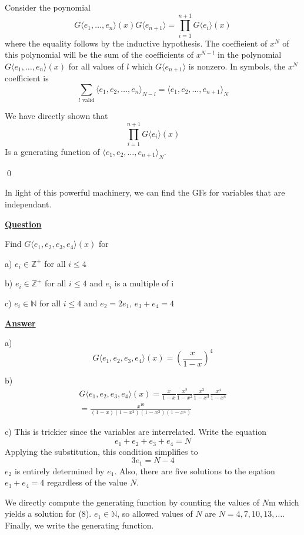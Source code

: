 \documentclass{article}
\newcommand{\new}[1]{
    \vspace{2mm}
    \noindent
    \textbf{
    \underline{#1}}
}
\begin{document}
Consider the poynomial 
\[
    G\langle e_1 , \dots, e_n \rangle(x)
    G\langle e_{n + 1} \rangle
    = 
    \prod_{i = 1}^{n + 1} 
    G\langle e_i \rangle(x)
\]where the equality follows by the inductive hypothesis. 
The coeffieient of $x^{N}$ of this polynomial 
will be the sum of the coefficients of $x^{N - l}$
in the polynomial $G\langle e_1 , \dots, e_n \rangle(x)$ 
for all values of $l$ which $G\langle e_{n+1}\rangle$
is nonzero. In symbols, the $x^N$ coefficient is 
\[
   \sum_{l \textrm{ valid}}
    \langle 
        e_1, e_2 , \dots, e_n
    \rangle _{N - l}
    = \langle 
        e_1, e_2 , \dots, e_{n + 1}
    \rangle _{N}
\]

We have directly shown that 
\[
    \prod_{i = 1}^{n + 1} 
    G\langle e_i \rangle(x)
\]
Is a generating function of $\langle 
        e_1, e_2 , \dots, e_{n + 1}
    \rangle _{N}$. 
    
    \hfill \qed

In light of this powerful machinery, we can find the 
GFs for variables that are independant. 

\new{Question}
Find $G\langle e_1, e_2, e_3, e_4\rangle (x)$ for 

a) $e_i \in \mathbb{Z}^+$ for all $i \leq 4$

b) $e_i \in \mathbb{Z}^+$ for all $i \leq 4$
and $e_i$ is a multiple of i

c) $e_i \in \mathbb{N}$ for all $i \leq 4$
and $e_2 = 2e_1$, $e_3 + e_4 = 4$

\new{Answer}

a) 
\[G\langle e_1, e_2, e_3, e_4\rangle (x) 
= 
\left(
\frac x {1- x}
\right)^4
\]

b) 
\[
    \begin{split}G\langle e_1, e_2, e_3, e_4\rangle (x) 
= 
\frac x {1- x}
\frac {x^2} {1- x^2}
\frac {x^3} {1- x^3}
\frac {x^4} {1- x^4}
\\= 
\frac {x^{10} }
{
    (1 - x)(1 - x^2)(1- x^3) (1 - x^4)
}
\end{split}
\]

c)
This is trickier since the variables 
are interrelated. Write the equation
\[
        e_1+ e_2+ e_3+ e_4  = N
\]
Applying the substitution, this condition simplifies to 
\begin{equation}
    3e_1 = N - 4
\end{equation}
$e_2$ is entirely determined by $e_1$. Also, there 
are five solutions to the eqation $e_3 + e_4 = 4$
regardless of the value $N$. 

We directly compute the generating function by counting 
the values of $N$m which yields a solution for (8). 
$e_1 \in \mathbb{N}$, so allowed values of $N$ are 
$N = 4, 7, 10, 13, \dots $. Finally, we write the 
generating function. 
\end{document}
